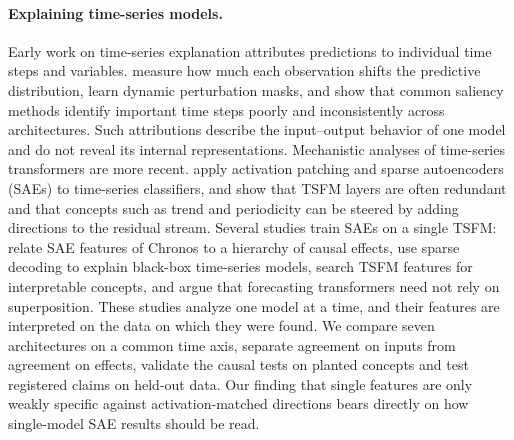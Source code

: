 \documentclass[twoside,11pt]{article}
\begin{document}
\paragraph{Explaining time-series models.}
Early work on time-series explanation attributes predictions to individual time steps and variables.
\citet{tonekaboni2020fit} measure how much each observation shifts the predictive distribution, \citet{crabbe2021dynamask} learn dynamic perturbation masks, and \citet{ismail2020benchmarking} show that common saliency methods identify important time steps poorly and inconsistently across architectures.
Such attributions describe the input--output behavior of one model and do not reveal its internal representations.
Mechanistic analyses of time-series transformers are more recent.
\citet{kalnare2025mechts} apply activation patching and sparse autoencoders (SAEs) to time-series classifiers, and \citet{wilinski2025exploring} show that TSFM layers are often redundant and that concepts such as trend and periodicity can be steered by adding directions to the residual stream.
Several studies train SAEs on a single TSFM: \citet{mishra2026dissecting} relate SAE features of Chronos to a hierarchy of causal effects, \citet{oublal2026timesae} use sparse decoding to explain black-box time-series models, \citet{divo2026zeitgeist} search TSFM features for interpretable concepts, and \citet{yildirim2026superposition} argue that forecasting transformers need not rely on superposition.
These studies analyze one model at a time, and their features are interpreted on the data on which they were found.
We compare seven architectures on a common time axis, separate agreement on inputs from agreement on effects, validate the causal tests on planted concepts and test registered claims on held-out data.
Our finding that single features are only weakly specific against activation-matched directions bears directly on how single-model SAE results should be read.
\end{document}
